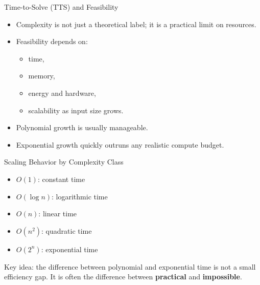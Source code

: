 \documentclass[aspectratio=43]{beamer}
\begin{document}
\begin{frame}{Time-to-Solve (TTS) and Feasibility}
\begin{itemize}
    \item Complexity is not just a theoretical label; it is a practical limit on resources.
    \item Feasibility depends on:
    \begin{itemize}
        \item time,
        \item memory,
        \item energy and hardware,
        \item scalability as input size grows.
    \end{itemize}
    \item Polynomial growth is usually manageable.
    \item Exponential growth quickly outruns any realistic compute budget.
\end{itemize}
\end{frame}

\begin{frame}{Scaling Behavior by Complexity Class}
\begin{itemize}
    \item \textbf{$O(1)$}: constant time
    \item \textbf{$O(\log n)$}: logarithmic time
    \item \textbf{$O(n)$}: linear time
    \item \textbf{$O(n^2)$}: quadratic time
    \item \textbf{$O(2^n)$}: exponential time
\end{itemize}

\medskip
Key idea: the difference between polynomial and exponential time is not a small efficiency gap. It is often the difference between \textbf{practical} and \textbf{impossible}.
\end{frame}
\end{document}
